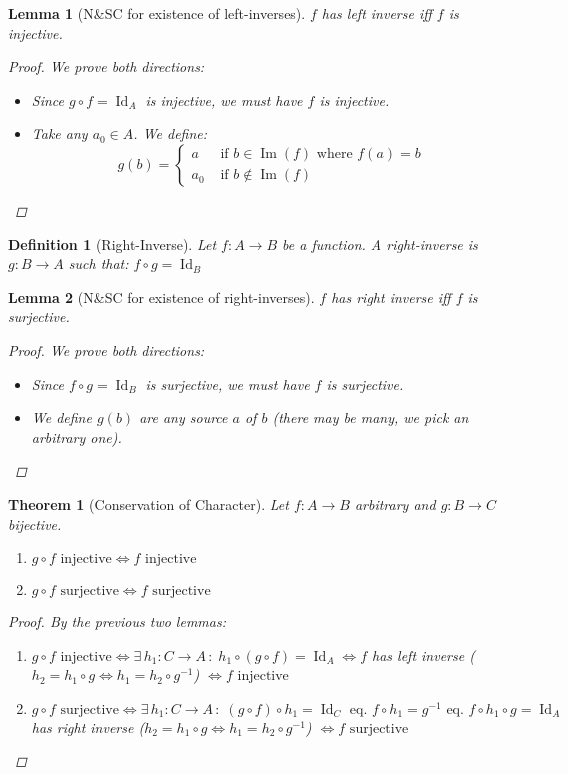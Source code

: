\documentclass[12pt]{article}
\let\RA\Rightarrow
\let\LA\Leftarrow
\let\LR\Leftrightarrow
\newcommand{\Exist}[1]{\exists\,{#1}\,:\;}
\DeclareMathOperator{\Image}{Im}
\DeclareMathOperator{\Id}{Id}
\newtheorem{theorem}{Theorem}[subsection]
\newtheorem{definition}{Definition}[subsection]
\newtheorem{lemma}{Lemma}[subsection]
\begin{document}
\begin{lemma}[N\&SC for existence of left-inverses]
  $f$ has left inverse iff $f$ is injective.
  \begin{proof}
    We prove both directions:
    \begin{itemize}
      \item [$(\RA)$] Since $g\circ f=\Id_A$ is injective, we must have $f$ is injective.
      \item [$(\LA)$] Take any $a_0\in A$. We define:
      $$
      g(b)=
      \begin{cases}
        a &\text{ if }b\in \Image(f)\text{ where } f(a)=b\\ a_0 &\text{ if }b\notin \Image(f)
      \end{cases}
      $$
    \end{itemize}
  \end{proof}
\end{lemma}

\begin{definition}[Right-Inverse]
  Let $f:A\to B$ be a function. A right-inverse is $g:B\to A$ such that: $f\circ g=\Id_B$
\end{definition}

\begin{lemma}[N\&SC for existence of right-inverses]
  $f$ has right inverse iff $f$ is surjective.
  \begin{proof}
    We prove both directions:
    \begin{itemize}
      \item [$(\RA)$] Since $f\circ g=\Id_B$ is surjective, we must have $f$ is surjective.
      \item [$(\LA)$] We define $g(b)$ are any source $a$ of $b$ (there may be many, we pick an arbitrary one).
    \end{itemize}
  \end{proof}
\end{lemma}

\begin{theorem}[Conservation of Character]
  Let $f:A\to B$ arbitrary and $g:B\to C$ bijective.
  \begin{enumerate}
    \item $g\circ f\text{ injective}\LR f\text{ injective}$
    \item $g\circ f\text{ surjective}\LR f\text{ surjective}$
  \end{enumerate}
  \begin{proof}
    By the previous two lemmas:
    \begin{enumerate}
      \item $g\circ f\text{ injective}\LR\Exist{h_1:C\to A}h_1\circ (g\circ f)=\Id_A\LR f$ has left inverse ($h_2=h_1\circ g\LR h_1=h_2\circ g^{-1}$) $\LR f\text{ injective}$
      \item $g\circ f\text{ surjective}\LR\Exist{h_1:C\to A}(g\circ f)\circ h_1=\Id_C \text{ eq. } f\circ h_1=g^{-1} \text{ eq. } f\circ h_1\circ g=\Id_A$ has right inverse ($h_2=h_1\circ g\LR h_1=h_2\circ g^{-1}$) $\LR f\text{ surjective}$
    \end{enumerate}
  \end{proof}
\end{theorem}
\end{document}
